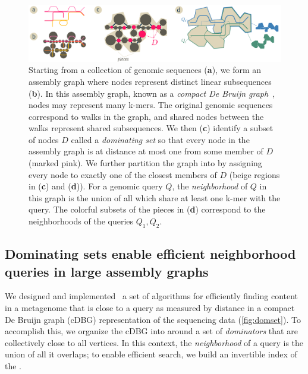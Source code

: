 %
%

\begin{figure}
 \centering
 \includegraphics[width=\linewidth]{domset}
	\caption{
 Starting from a collection of genomic sequences (\textbf a), we form an assembly graph
 where nodes represent distinct linear subsequences (\textbf b). In this assembly graph,
 known as a \emph{compact De Bruijn graph}~\cite{lin2016accurate}, nodes may
 represent many k-mers. The original genomic sequences correspond to walks in
 the graph, and shared nodes between the walks represent shared subsequences.
 We then (\textbf c) identify a subset of nodes $D$ called a \emph{dominating set} so that
 every node in the assembly graph is at distance at most one from some member of
 $D$ (marked pink). We further partition the graph into \emph{\pieces}
 by assigning every node to exactly one of the closest members of $D$ (beige regions
 in (\textbf c) and (\textbf d)).
 For a genomic query $Q$, the \emph{neighborhood} of $Q$ in this graph is the
 union of all \pieces which share at least one k-mer with the query. The colorful
 subsets of the pieces in (\textbf d) correspond to the neighborhoods of the
 queries $Q_1, Q_2$.
 }
 \label{fig:domset}
\end{figure}

\subsection*{Dominating sets enable efficient neighborhood queries in large assembly graphs}

We designed and implemented~\cite{spacegraphcats} a set of algorithms for efficiently
finding content in a metagenome that is close to a query as measured
by distance in a compact De Bruijn graph (cDBG) representation of the
sequencing data (\autoref{fig:domset}). To accomplish this, we organize the cDBG into {\em \pieces}
around a set of \emph{dominators} that are collectively close to all vertices. In this
context, the {\em neighborhood} of a query is the union of all \pieces it overlaps;
to enable efficient search, we build an invertible index of the \pieces.

